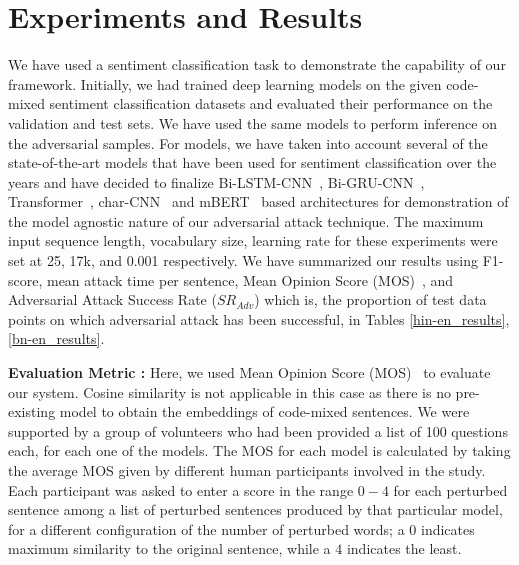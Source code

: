 \documentclass[sigconf]{acmart}
\begin{document}
\section{Experiments and Results}
We have used a sentiment classification task to demonstrate the capability of our framework. Initially, we had trained deep learning models on the given code-mixed sentiment classification datasets and evaluated their performance on the validation and test sets. We have used the same models to perform inference on the adversarial samples.
For models, we have taken into account several of the state-of-the-art models that have been used for sentiment classification over the years and have decided to finalize Bi-LSTM-CNN~\cite{jamatia2020deep}, Bi-GRU-CNN~\cite{jamatia2020deep}, Transformer~\cite{palomino2020palominoochoa}, char-CNN~\cite{zhang2015character} and mBERT~\cite{pires2019multilingual} based architectures for demonstration of the model agnostic nature of our adversarial attack technique.
The maximum input sequence length, vocabulary size, learning rate for these experiments were set at 25, 17k, and 0.001 respectively. We have summarized our results using F1-score, mean attack time per sentence, Mean Opinion Score (MOS)~\cite{streijl2016mean}, and Adversarial Attack Success Rate ($SR_{Adv}$) which is, the proportion of test data points on which adversarial attack has been successful, in Tables \ref{hin-en_results}, \ref{bn-en_results}. 

\textbf{Evaluation Metric : }
Here, we used Mean Opinion Score (MOS)~\cite{streijl2016mean} to evaluate our system. Cosine similarity is not applicable in this case as there is no pre-existing model to obtain the embeddings of code-mixed sentences. We were supported by a group of volunteers who had been provided a list of 100 questions each, for each one of the models. 
The MOS for each model is calculated by taking the average MOS given by different human participants involved in the study. Each participant was asked to enter a score in the range $0-4$ for each perturbed sentence among a list of perturbed sentences produced by that particular model, for a different configuration of the number of perturbed words; a $0$ indicates maximum similarity to the original sentence, while a $4$ indicates the least.
\end{document}
